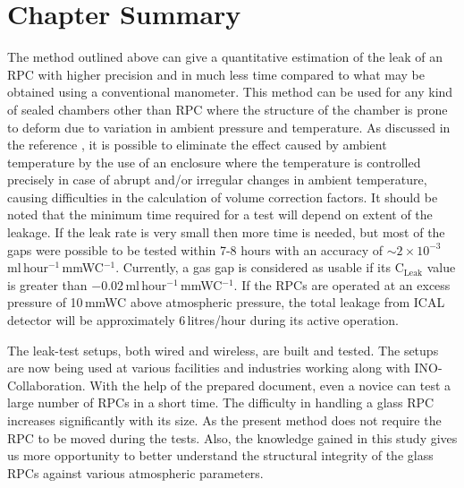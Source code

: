 \section{Chapter Summary}\label{sec:summary}
The method outlined above can give a quantitative estimation of the
leak of an RPC with higher precision and in much less time compared to
what may be obtained using a conventional manometer. This method can
be used for any kind of sealed chambers other than RPC where the
structure of the chamber is prone to deform due to variation in
ambient pressure and temperature. As discussed in the reference
\cite{rpcleak2016}, it is possible to eliminate the effect caused by
ambient temperature by the use of an enclosure where the temperature
is controlled precisely in case of abrupt and/or irregular changes in
ambient temperature, causing difficulties in the calculation of volume
correction factors. It should be noted that the minimum time required
for a test will depend on extent of the leakage. If the leak rate is
very small then more time is needed, but most of the gaps were
possible to be tested within 7-8 hours with an accuracy of
$\sim 2\times 10^{-3}$\,ml\,hour$^{-1}$\,mmWC$^{-1}$. Currently, a gas
gap is considered as usable if its $\textrm{C}_{\textrm{Leak}}$ value is
greater than $-0.02$\,ml\,hour$^{-1}$\,mmWC$^{-1}$. If the RPCs are
operated at an excess pressure of 10\,mmWC above atmospheric pressure,
the total leakage from ICAL detector will be approximately
6\,litres/hour during its active operation.

The leak-test setups, both wired and wireless, are built and tested.
The setups are now being used at various facilities and industries
working along with INO-Collaboration. With the help of the prepared
document, even a novice can test a large number of RPCs in a short
time. The difficulty in handling a glass RPC increases significantly
with its size. As the present method does not require the RPC to be
moved during the tests. Also, the
knowledge gained in this study gives us more opportunity to better
understand the structural integrity of the glass RPCs against various
atmospheric parameters.


